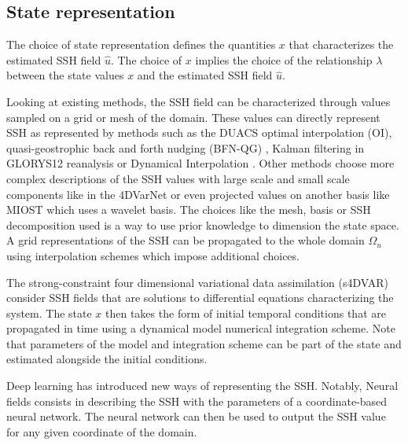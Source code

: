 \begin{bibunit}
 
  \subsection*{State representation}
The choice of state representation defines the quantities $x$ that characterizes the estimated SSH field $\hat{u}$. The choice of $x$ implies the choice of the relationship $\lambda$ between the state values $x$ and the estimated SSH field $\hat{u}$. 


  Looking at existing methods, the SSH field can be characterized through values sampled on a grid or mesh of the domain. These values can directly represent SSH as represented by methods such as the DUACS optimal interpolation \cite{taburetDUACSDT2018252019} (OI), quasi-geostrophic back and forth nudging (BFN-QG) \cite{guillouMappingAltimetryForthcoming2021}, Kalman filtering in GLORYS12 reanalysis \cite{lelloucheCopernicusGlobal122021} or Dynamical Interpolation \cite{ubelmannDynamicInterpolationSea2015,ballarottaDynamicMappingAlongTrack2020} .
  Other methods choose more complex descriptions of the SSH values with large scale and small scale components like in the 4DVarNet\cite{beauchamp4DVarNetSSHEndtoendLearning2023} or even projected values on another basis like MIOST\cite{ubelmannReconstructingOceanSurface2021,ubelmannSimultaneousEstimationOcean2022} which uses a wavelet basis.
  The choices like the mesh, basis or SSH decomposition used is a way to use prior knowledge to dimension the state space. A grid representations of the SSH can be propagated to the whole domain $\Omega_u$ using interpolation schemes which impose additional choices.

  The strong-constraint four dimensional variational data assimilation (s4DVAR)\cite{carrassiDataAssimilationGeosciences2018} consider SSH fields that are solutions to differential equations characterizing the system. The state $x$ then takes the form of initial temporal conditions that are propagated in time using a dynamical model numerical integration scheme. Note that parameters of the model and integration scheme can be part of the state and estimated alongside the initial conditions. 

  Deep learning has introduced new ways of representing the SSH. Notably, Neural fields\cite{johnsonNeuralFieldsFast2022} consists in describing the SSH with the parameters of a coordinate-based neural network. The neural network can then be used to output the SSH value for any given coordinate of the domain.




\end{bibunit}
